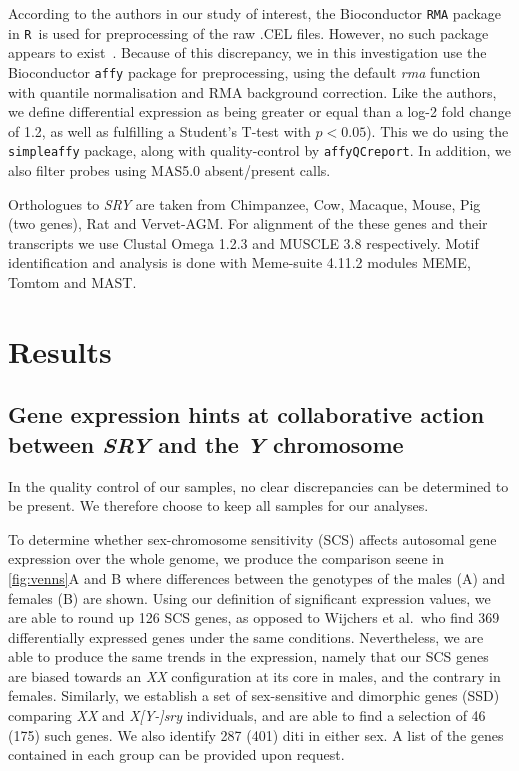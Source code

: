 \documentclass[10pt, twocolumn]{article}\usepackage[]{graphicx}\usepackage[]{color}
\theoremstyle{plain}
\newcommand{\R}{\texttt{R}}
\newcommand{\SRY}{\textit{SRY}\xspace}
\newcommand{\XX}{\textit{XX}\xspace}
\newcommand{\XYSRY}{\textit{X[Y-]sry}\xspace}
\newcommand{\Y}{\textit{Y}\xspace}
\begin{document}
According to the authors in our study of interest, the Bioconductor \texttt{RMA} package in \R~is used for preprocessing of the raw .CEL files. However, no such package appears to exist~\cite{biocpackages}. Because of this discrepancy, we in this investigation use the Bioconductor \texttt{affy} package for preprocessing, using the default \textit{rma} function with quantile normalisation and RMA background correction. Like the authors, we define differential expression as being greater or equal than a log-2 fold change of 1.2, as well as fulfilling a Student's T-test with $p < 0.05$). This we do using the \texttt{simpleaffy} package, along with quality-control by \texttt{affyQCreport}. In addition, we also filter probes using MAS5.0 absent/present calls. 

Orthologues to \SRY are taken from Chimpanzee, Cow, Macaque, Mouse, Pig (two genes), Rat and Vervet-AGM. For alignment of the these genes and their transcripts we use Clustal Omega 1.2.3 and MUSCLE 3.8 respectively. Motif identification and analysis is done with Meme-suite 4.11.2 modules MEME, Tomtom and MAST. 

\section*{Results}





\subsection*{Gene expression hints at collaborative action between \SRY and the \Y chromosome}
In the quality control of our samples, no clear discrepancies can be determined to be present. We therefore choose to keep all samples for our analyses.

To determine whether sex-chromosome sensitivity (SCS) affects autosomal gene expression over the whole genome, we produce the comparison seene in \cref{fig:venns}A and B where differences between the genotypes of the males (A) and females (B) are shown. Using our definition of significant expression values, we are able to round up 126 SCS genes, as opposed to Wijchers et al.\ who find 369 differentially expressed genes under the same conditions. Nevertheless, we are able to produce the same trends in the expression, namely that our SCS genes are biased towards an \XX configuration at its core in males, and the contrary in females. Similarly, we establish a set of sex-sensitive and dimorphic genes (SSD) comparing \XX and \XYSRY individuals, and are able to find a selection of 46 (175) such genes. We also identify 287 (401) diti in either sex. A list of the genes contained in each group can be provided upon request.
\end{document}
